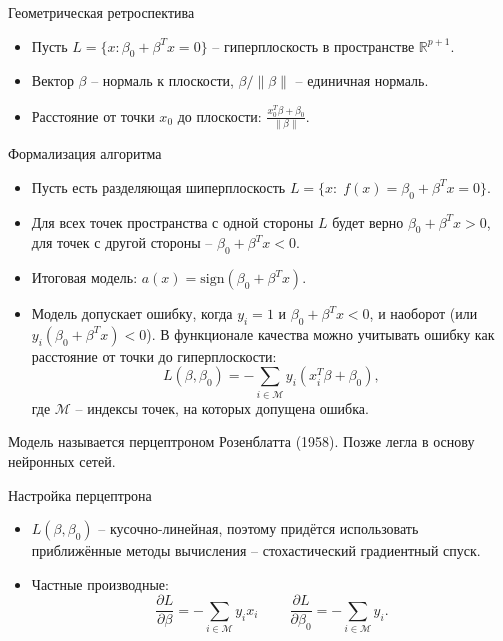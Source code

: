 \documentclass[9pt]{beamer}
\begin{document}
\begin{frame}{Геометрическая ретроспектива}
\begin{itemize}
    \item Пусть $L = \{x: \beta_0 + \beta^T x = 0\}$ -- гиперплоскость в пространстве $\mathbb{R}^{p+1}$.
    \item Вектор $\beta$ -- нормаль к плоскости, $\beta/\|\beta\|$ -- единичная нормаль.
    \item Расстояние от точки $x_0$ до плоскости: $\frac{x_0^T\beta + \beta_0}{\|\beta\|}$.
\end{itemize}
    
\end{frame}
\begin{frame}{Формализация алгоритма}
    \begin{itemize}
        \item Пусть есть разделяющая шиперплоскость $L = \{x:\; f(x) = \beta_0 + \beta^T x = 0\}$.
        \item Для всех точек пространства с одной стороны $L$ будет верно $\beta_0 + \beta^T x > 0$, для точек с другой стороны -- $\beta_0 + \beta^T x < 0$.
        \item Итоговая модель: $a(x) = \text{sign} (\beta_0 + \beta^T x)$.
        \item Модель допускает ошибку, когда $y_i = 1$ и $\beta_0 + \beta^T x < 0$, и наоборот (или $y_i(\beta_0 + \beta^T x) < 0$). В функционале качества можно учитывать ошибку как расстояние от точки до гиперплоскости:
        $$L(\beta, \beta_0) = -\sum_{i\in \mathcal{M}} y_i(x_i^T\beta + \beta_0),$$
        где $\mathcal{M}$ -- индексы точек, на которых допущена ошибка.
    \end{itemize}
    Модель называется перцептроном Розенблатта (1958). Позже легла в основу нейронных сетей.
\end{frame}

\begin{frame}{Настройка перцептрона}
\begin{itemize}
    \item $L(\beta, \beta_0)$ -- кусочно-линейная, поэтому придётся использовать приближённые методы вычисления -- стохастический градиентный спуск.
    \item Частные производные:
    $$\frac{\partial L}{\partial \beta} = -\sum_{i\in\mathcal{M}} y_ix_i \;\;\;\;\;\;\;\; \frac{\partial L}{\partial \beta_0} = -\sum_{i\in\mathcal{M}} y_i.$$
\end{itemize}
\end{frame}
\end{document}
